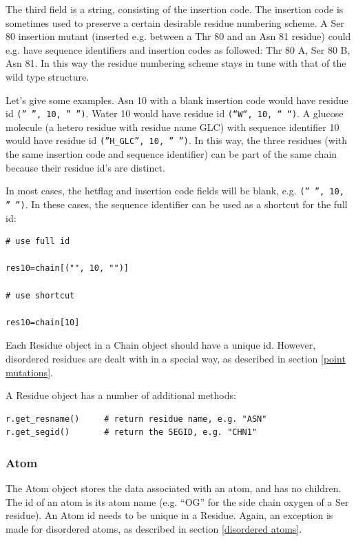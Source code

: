 \documentclass{report}
\begin{document}
The third field is a string, consisting of the insertion code. The insertion
code is sometimes used to preserve a certain desirable residue numbering scheme.
A Ser 80 insertion mutant (inserted e.g. between a Thr 80 and an Asn 81 residue)
could e.g. have sequence identifiers and insertion codes as followed: Thr 80
A, Ser 80 B, Asn 81. In this way the residue numbering scheme stays in tune
with that of the wild type structure. 

Let's give some examples. Asn 10 with a blank insertion code would have residue
id {\tt ('' '', 10, '' '')}. Water 10 would have residue id {\tt (``W``, 10, `` ``)}.
A glucose molecule (a hetero residue with residue name GLC) with sequence identifier
10 would have residue id {\tt (''H\_GLC'', 10, '' '')}. In this way, the three
residues (with the same insertion code and sequence identifier) can be part
of the same chain because their residue id's are distinct.

In most cases, the hetflag and insertion code fields will be blank, e.g. {\tt ('' '', 10, '' '')}.
In these cases, the sequence identifier can be used as a shortcut for the full
id:

\begin{verbatim}
# use full id

res10=chain[("", 10, "")]

# use shortcut 

res10=chain[10]
\end{verbatim}

Each Residue object in a Chain object should have a unique id. However, disordered
residues are dealt with in a special way, as described in section \ref{point mutations}.

A Residue object has a number of additional methods:

\begin{verbatim}
r.get_resname()		# return residue name, e.g. "ASN"
r.get_segid()		# return the SEGID, e.g. "CHN1"
\end{verbatim}

\subsubsection{Atom}

The Atom object stores the data associated with an atom, and has no children.
The id of an atom is its atom name (e.g. {}``OG{}'' for the side chain oxygen
of a Ser residue). An Atom id needs to be unique in a Residue. Again, an exception
is made for disordered atoms, as described in section \ref{disordered atoms}.
\end{document}
